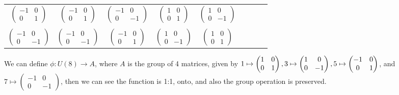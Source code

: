 \begin{table}[H]
{\begin{center}
\begin{tabular}{c|cccccccc}
\\
$\begin{pmatrix}-1 & 0 \\0 & 1\end{pmatrix}$       
& $\begin{pmatrix}-1 & 0 \\0 & 1\end{pmatrix}$ 
& $\begin{pmatrix}-1 & 0 \\0 & -1\end{pmatrix}$ 
& $\begin{pmatrix}1 & 0 \\ 0 & 1 \end{pmatrix}$ 
& $\begin{pmatrix}1 & 0 \\0 & -1\end{pmatrix}$ \\
\\
$\begin{pmatrix}-1 & 0 \\0 & -1\end{pmatrix}$       
& $\begin{pmatrix}-1 & 0 \\0 & -1\end{pmatrix}$ 
& $\begin{pmatrix}-1 & 0 \\0 & 1\end{pmatrix}$ 
& $\begin{pmatrix}1 & 0 \\0 & -1\end{pmatrix}$ 
& $\begin{pmatrix}1 & 0 \\ 0 & 1 \end{pmatrix}$ \\
\end{tabular}
\end{center}
}
\end{table}

\noindent We can define $\phi: U(8) \rightarrow A$, where $A$ is the group of 4 matrices, given by  $1\mapsto \begin{pmatrix}1 & 0 \\ 0 & 1 \end{pmatrix}, 3 \mapsto \begin{pmatrix}1 & 0 \\0 & -1\end{pmatrix},
\\
5 \mapsto \begin{pmatrix}-1 & 0 \\0 & 1\end{pmatrix}$, and $7 \mapsto \begin{pmatrix}-1 & 0 \\0 & -1\end{pmatrix}$, then we can see the function is 1:1, onto, and also the group operation is preserved. 
\\
\\

